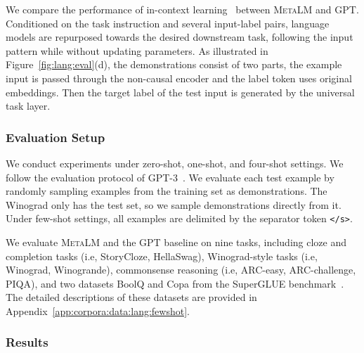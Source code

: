 \documentclass{article}
\theoremstyle{plain}
\theoremstyle{definition}
\theoremstyle{remark}
\newcommand\ours{\textsc{MetaLM}}
\begin{document}
We compare the performance of in-context learning~\citep{gpt3} between \ours{} and GPT.
Conditioned on the task instruction and several input-label pairs, language models are repurposed towards the desired downstream task, following the input pattern while without updating parameters.
As illustrated in Figure~\ref{fig:lang:eval}(d), the demonstrations consist of two parts, the example input is passed through the non-causal encoder and the label token uses original embeddings.
Then the target label of the test input is generated by the universal task layer.


\subsubsection{Evaluation Setup}

We conduct experiments under zero-shot, one-shot, and four-shot settings.
We follow the evaluation protocol of GPT-3~\citep{gpt3}.
We evaluate each test example by randomly sampling examples from the training set as demonstrations.
The Winograd only has the test set, so we sample demonstrations directly from it.
Under few-shot settings, all examples are delimited by the separator token \texttt{</s>}.

We evaluate \ours{} and the GPT baseline on nine tasks, including cloze and completion tasks (i.e, StoryCloze, HellaSwag), Winograd-style tasks (i.e, Winograd, Winogrande), commonsense reasoning (i.e, ARC-easy, ARC-challenge, PIQA), and two datasets BoolQ and Copa from the SuperGLUE benchmark~\citep{superglue}.
The detailed descriptions of these datasets are provided in Appendix~\ref{app:corpora:data:lang:fewshot}.


\subsubsection{Results}
\end{document}
